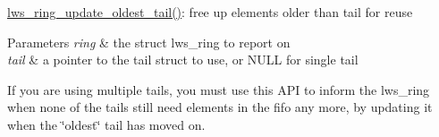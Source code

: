 \hyperlink{group__lws__ring_gac4ec0634b0a901c4cc9cad33fcd7273b}{lws\+\_\+ring\+\_\+update\+\_\+oldest\+\_\+tail()}\+: free up elements older than tail for reuse


\begin{DoxyParams}{Parameters}
{\em ring} & the struct lws\+\_\+ring to report on \\
\hline
{\em tail} & a pointer to the tail struct to use, or N\+U\+LL for single tail\\
\hline
\end{DoxyParams}
If you are using multiple tails, you must use this A\+PI to inform the lws\+\_\+ring when none of the tails still need elements in the fifo any more, by updating it when the \char`\"{}oldest\char`\"{} tail has moved on. 